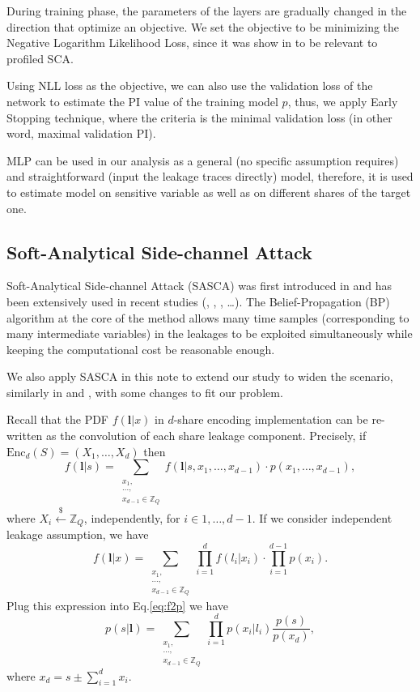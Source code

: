 \documentclass{llncs}
\begin{document}
During training phase, the parameters of the layers are gradually changed in the direction that optimize an objective. We set the objective to be minimizing the Negative Logarithm Likelihood Loss, since it was show in \cite{DNN} to be relevant to profiled SCA.

Using NLL loss as the objective, we can also use the validation loss of the network to estimate the PI value of the training model $p$, thus, we apply Early Stopping technique, where the criteria is the minimal validation loss (in other word, maximal validation PI). 

MLP can be used in our analysis as a general (no specific assumption requires) and straightforward (input the leakage traces directly) model, therefore, it is used to estimate model on sensitive variable as well as on different shares of the target one.
\subsection*{Soft-Analytical Side-channel Attack}
Soft-Analytical Side-channel Attack (SASCA) was first introduced in \cite{sasca} and has been extensively used in recent studies (\cite{lcert}, \cite{mshares}, \cite{primemask}, \dots). The Belief-Propagation (BP) algorithm at the core of the method allows many time samples (corresponding to many intermediate variables) in the leakages to be exploited simultaneously while keeping the computational cost be reasonable enough. 

We also apply SASCA in this note to extend our study to widen the scenario, similarly in \cite{primemask} and \cite{mshares}, with some changes to fit our problem.

Recall that the PDF $f(\bm{l}|x)$ in $d$-share encoding implementation can be re-written as the convolution of each share leakage component. Precisely, if $\text{Enc}_d(S) = (X_1, \dots, X_d)$ then 
\begin{equation}
	f(\bm{l}|s) = \sum_{\substack{x_1,\\\dots, \\x_{d-1} \in \mathbb{Z}_Q}}f(\bm{l}|s, x_1, \dots, x_{d-1})\cdot p(x_1, \dots, x_{d-1}),
\end{equation}
where $X_i \overset{\$}{\leftarrow} \mathbb{Z}_Q$, independently, for $i\in {1, \dots, d-1}$. If we consider independent leakage assumption, we have
\begin{equation}
	f(\bm{l}|x) = \sum_{\substack{x_1,\\\dots, \\x_{d-1} \in  \mathbb{Z}_Q}}\prod_{i=1}^{d}f(l_i|x_i)\cdot \prod_{i=1}^{d-1}p(x_i).
\end{equation}
Plug this expression into Eq.\ref{eq:f2p} we have
\begin{equation}
	p\left( s|\bm{l}\right)  = \sum_{\substack{x_1,\\\dots, \\x_{d-1} \in \mathbb{Z}_Q}} \prod_{i=1}^{d} p\left( x_i|l_i\right) \frac{p(s)}{p(x_d)},
\end{equation}
where $x_d = s \pm \sum_{i=1}^d x_i$.
\end{document}
